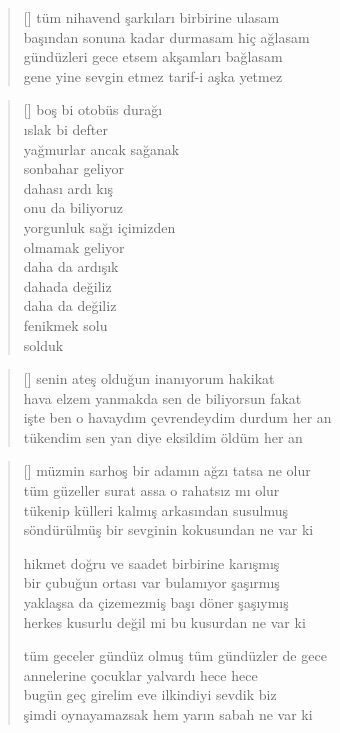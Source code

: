 \documentclass[a5paper, openright, twoside]{memoir}
\begin{document}
\begin{verse}[\versewidth]
  tüm nihavend şarkıları birbirine ulasam \\
  başından sonuna kadar durmasam hiç ağlasam \\
  gündüzleri gece etsem akşamları bağlasam \\
  gene yine sevgin etmez tarif-i aşka yetmez \\
\end{verse}
\begin{verse}[\versewidth]
  boş bi otobüs durağı \\
  ıslak bi defter \\
  yağmurlar ancak sağanak \\
  sonbahar geliyor \\
  dahası ardı kış \\
  onu da biliyoruz \\
  yorgunluk sağı içimizden \\
  olmamak geliyor \\
  daha da ardışık \\
  dahada değiliz \\
  daha da değiliz \\
  fenikmek solu \\
  solduk \\
\end{verse}
\begin{verse}[\versewidth]
  senin ateş olduğun inanıyorum hakikat \\
  hava elzem yanmakda sen de biliyorsun fakat \\
  işte ben o havaydım çevrendeydim durdum her an \\
  tükendim sen yan diye eksildim öldüm her an \\
\end{verse}
\begin{verse}[\versewidth]
  müzmin sarhoş bir adamın ağzı tatsa ne olur \\
  tüm güzeller surat assa o rahatsız mı olur \\
  tükenip külleri kalmış arkasından susulmuş \\
  söndürülmüş bir sevginin kokusundan ne var ki

  hikmet doğru ve saadet birbirine karışmış \\
  bir çubuğun ortası var bulamıyor şaşırmış \\
  yaklaşsa da çizemezmiş başı döner şaşıymış \\
  herkes kusurlu değil mi bu kusurdan ne var ki

  tüm geceler gündüz olmuş tüm gündüzler de gece \\
  annelerine çocuklar yalvardı hece hece \\
  bugün geç girelim eve ilkindiyi sevdik biz \\
  şimdi oynayamazsak hem yarın sabah ne var ki \\
\end{verse}
\end{document}
